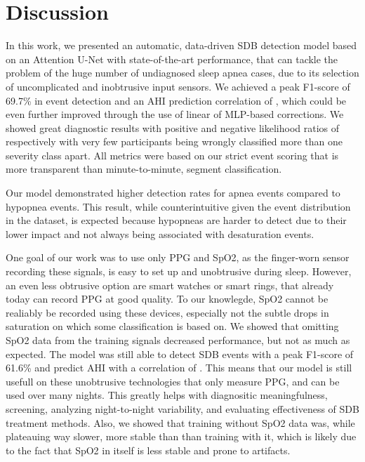 \chapter{Discussion \label{Chapter-Discussion}}


In this work, we presented an automatic, data-driven SDB detection model based on an Attention U-Net with state-of-the-art performance, that can tackle the problem of the huge number of undiagnosed sleep apnea cases, due to its selection of uncomplicated and inobtrusive input sensors. We achieved a peak F1-score of 69.7\% in event detection and an AHI prediction correlation of , which could be even further improved through the use of linear of MLP-based corrections. We showed great diagnostic results with positive and negative likelihood ratios of  respectively with very few participants being wrongly classified more than one severity class apart. All metrics were based on our strict event scoring that is more transparent than minute-to-minute, segment classification.

Our model demonstrated higher detection rates for apnea events compared to hypopnea events. This result, while counterintuitive given the event distribution in the dataset, is expected because hypopneas are harder to detect due to their lower impact and not always being associated with desaturation events.

One goal of our work was to use only PPG and SpO2, as the finger-worn sensor recording these signals, is easy to set up and unobtrusive during sleep. However, an even less obtrusive option are smart watches or smart rings, that already today can record PPG at good quality. To our knowlegde, SpO2 cannot be realiably be recorded using these devices, especially not the subtle drops in saturation on which some classification is based on. 
We showed that omitting SpO2 data from the training signals decreased performance, but not as much as expected. The model was still able to detect SDB events with a peak F1-score of 61.6\% and predict AHI with a correlation of . This means that our model is still usefull on these unobtrusive technologies that only measure PPG, and can be used over many nights. This greatly helps with diagnositic meaningfulness, screening, analyzing night-to-night variability, and evaluating effectiveness of SDB treatment methods.
Also, we showed that training without SpO2 data was, while plateauing way slower, more stable than than training with it, which is likely due to the fact that SpO2 in itself is less stable and prone to artifacts. 

